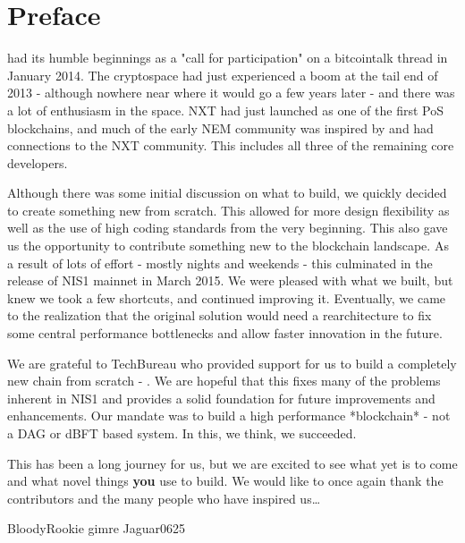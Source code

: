 \section*{Preface}


 had its humble beginnings as a "call for participation" on a bitcointalk thread in January 2014.
The cryptospace had just experienced a boom at the tail end of 2013 - although nowhere near where it would go a few years later - and there was a lot of enthusiasm in the space.
NXT had just launched as one of the first PoS blockchains, and much of the early NEM community was inspired by and had connections to the NXT community. This includes all three of the remaining core developers.

Although there was some initial discussion on what to build, we quickly decided to create something new from scratch.
This allowed for more design flexibility as well as the use of high coding standards from the very beginning.
This also gave us the opportunity to contribute something new to the blockchain landscape.
As a result of lots of effort - mostly nights and weekends - this culminated in the release of NIS1 mainnet in March 2015.
We were pleased with what we built, but knew we took a few shortcuts, and continued improving it.
Eventually, we came to the realization that the original solution would need a rearchitecture to fix some central performance bottlenecks and allow faster innovation in the future.

We are grateful to TechBureau who provided support for us to build a completely new chain from scratch - \codename.
We are hopeful that this fixes many of the problems inherent in NIS1 and provides a solid foundation for future improvements and enhancements.
Our mandate was to build a high performance *blockchain* - not a DAG or dBFT based system.
In this, we think, we succeeded.

This has been a long journey for us, but we are excited to see what yet is to come and what novel things \textbf{you} use \codenamespace to build.
We would like to once again thank the contributors and the many people who have inspired us\ldots

\begin{flushright}
BloodyRookie
gimre
Jaguar0625
\end{flushright}
